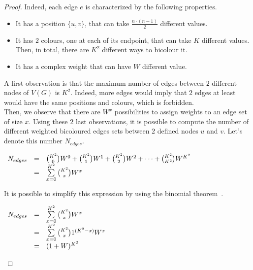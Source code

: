 \begin{proof}
    Indeed, each edge $e$ is characterized by the following properties.
    \begin{itemize}
        \item It has a position $\{u, v\}$, that can take $\frac{n \cdot (n -1)}{2}$ different values.
        \item It has $2$ colours, one at each of its endpoint, that can take $K$ different values.
            Then, in total, there are $K^2$ different ways to bicolour it.
        \item It has a complex weight that can have $W$ different value.
    \end{itemize}

    A first observation is that the maximum number of edges between $2$ different nodes of $V(G)$ is $K^2$.
    Indeed, more edges would imply that $2$ edges at least would have the same positions and colours, which is forbidden.\\

    Then, we observe that there are $W^x$ possibilities to assign weights to an edge set of size $x$.
    Using these $2$ last observations, it is possible to compute the number of different weighted bicoloured edges sets between $2$ defined nodes $u$ and $v$.
    Let's denote this number $N_{edges}$.

    \begin{center}
        $\begin{array}{r c l}
             N_{edges} & = & {K^2 \choose 0} W^0 + {K^2 \choose 1} W^1 + {K^2 \choose 2} W^2 + \cdots + {K^2 \choose K^2} W^{K^2} \\
                       & = & \sum\limits_{x=0}^{K^2} {K^2 \choose x} W^x
        \end{array}$
    \end{center}

    It is possible to simplify this expression by using the binomial theorem~\cite{wikipediaBinomialTheorem}.

    \begin{center}
        $\begin{array}{r c l}
             N_{edges} & = & \sum\limits_{x=0}^{K^2} {K^2 \choose x} W^x               \\
                       & = & \sum\limits_{x=0}^{K^2} {K^2 \choose x} 1^{(K^2 - x)} W^x \\
                       & = & (1 + W)^{K^2}
        \end{array}$
    \end{center}


\end{proof}
